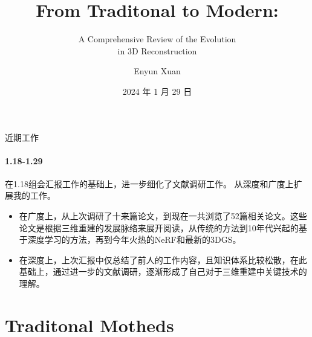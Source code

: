 \documentclass[dark]{sintefbeamer}
\title{From Traditonal to Modern:}
\subtitle{A Comprehensive Review of the Evolution \\ in 3D Reconstruction}
\author{Enyun Xuan}
\date{2024 年 1 月 29 日}
\begin{document}
\maketitle

\begin{frame}{近期工作}
  \framesubtitle{1.18-1.29}

  在1.18组会汇报工作的基础上，进一步细化了文献调研工作。
  从深度和广度上扩展我的工作。

  \begin{itemize}
    \item 在广度上，从上次调研了十来篇论文，到现在一共浏览了52篇相关论文。这些论文是根据三维重建的发展脉络来展开阅读，从传统的方法到10年代兴起的基于深度学习的方法，再到今年火热的NeRF和最新的3DGS。
    \item 在深度上，上次汇报中仅总结了前人的工作内容，且知识体系比较松散，在此基础上，通过进一步的文献调研，逐渐形成了自己对于三维重建中关键技术的理解。
  \end{itemize}

\end{frame}

\section{Traditonal Motheds}
\end{document}
